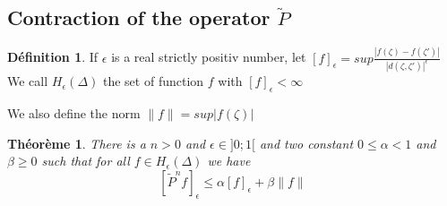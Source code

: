 \documentclass[12pt]{article}
\theoremstyle{plain}%
\newtheorem{thm}{Théorème}[section]
\theoremstyle{definition}
\newtheorem{dfnt}{Définition}[section]
\theoremstyle{remark}
\begin{document}
\subsection{Contraction of the operator $\tilde{P}$ }
\begin{dfnt}
If $\epsilon$ is a real strictly positiv number, let $[f]_\epsilon= sup \frac{|f(\zeta)-f(\zeta')|}{|d(\zeta,\zeta')|^\epsilon}$ \newline
We call $H_\epsilon(\Delta)$ the set of function $f$ with $[f]_\epsilon < \infty$
\end{dfnt}
We also define the norm $\| f \|=sup |f(\zeta)|$
\begin{thm}
There is a $n >0$ and $\epsilon \in ]0;1[$ and two constant
 $0 \leq \alpha < 1$ and $\beta \geq 0$ such that for all $f\in H_\epsilon(\Delta)$
 we have \[
[\tilde{P}^n f]_\epsilon \leq \alpha [f]_\epsilon +\beta \| f \|
 \]
 \end{thm}
\end{document}
